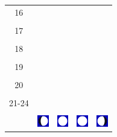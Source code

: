 \documentclass[a4paper,12pt, tikz]{scrartcl}
\begin{document}
\begin{tabularx}{\linewidth}{|c|X|X|p{2cm}|p{2cm}|}
            &   &       &    &   \\
          \hline
          16&   &                 &    &   \\
            &   &       &    &   \\
          \hline
          17&   &                 &    &   \\
            &   &       &    &   \\
          \hline
          18&   &                 &    &   \\
            &   &       &    &   \\
          \hline
          19&   &                 &     &   \\
            &   &       &    &   \\
          \hline
          20&   &              &    &   \\
            &   &       &    &   \\
          \hline 
          21-24&   &              &    &   \\
            &   &       &    &   \\
          \hline
                      & \vspace{0.01cm} \centerline{\includegraphics[width=0.5cm]{moon_phases/Moon_phase_3.svg.png}} \vspace{0.1cm} & \vspace{0.01cm} \centerline{\includegraphics[width=0.5cm]{moon_phases/Moon_phase_4.svg.png}} \vspace{0.1cm} & \vspace{0.01cm} \centerline{\includegraphics[width=0.5cm]{moon_phases/Moon_phase_4.svg.png}} \vspace{0.1cm} & \vspace{0.01cm} \centerline{\includegraphics[width=0.5cm]{moon_phases/Moon_phase_5.svg.png}} \vspace{0.1cm}\\
          \hline    
        \end{tabularx}
\end{document}

